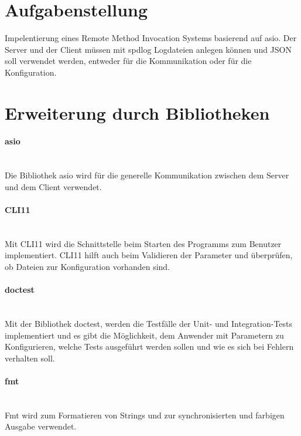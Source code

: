 \section{Aufgabenstellung}
Impelentierung eines Remote Method Invocation Systems basierend auf asio. Der Server und der Client müssen mit spdlog Logdateien anlegen können und JSON soll verwendet werden, entweder für die Kommunikation oder für die Konfiguration.

\section{Erweiterung durch Bibliotheken}

\paragraph{asio} \mbox{} \vspace{2mm} \\
Die Bibliothek asio wird für die generelle Kommunikation zwischen dem Server und dem Client verwendet.

\paragraph{CLI11} \mbox{} \vspace{2mm} \\
Mit CLI11 wird die Schnittstelle beim Starten des Programms zum Benutzer implementiert. CLI11 hilft auch beim Validieren der Parameter und überprüfen, ob Dateien zur Konfiguration vorhanden sind.

\paragraph{doctest} \mbox{} \vspace{2mm} \\
Mit der Bibliothek doctest, werden die Testfälle der Unit- und Integration-Tests implementiert und es gibt die Möglichkeit, dem Anwender mit Parametern zu Konfigurieren, welche Tests ausgeführt werden sollen und wie es sich bei Fehlern verhalten soll.

\paragraph{fmt} \mbox{} \vspace{2mm} \\
Fmt wird zum Formatieren von Strings und zur synchronisierten und farbigen Ausgabe verwendet.
 
